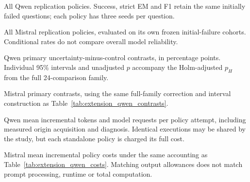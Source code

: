 \documentclass{article}
\begin{document}
\begin{table}[htbp]
\centering\footnotesize
\caption{All Qwen replication policies. Success, strict EM and F1 retain
the same initially failed questions; each policy has three seeds per question.}
\label{tab:extension_qwen_results}

\end{table}

\begin{table}[htbp]
\centering\footnotesize
\caption{All Mistral replication policies, evaluated on its own frozen
initial-failure cohorts. Conditional rates do not compare overall model reliability.}
\label{tab:extension_mistral_results}

\end{table}

\begin{table}[htbp]
\centering\footnotesize
\caption{Qwen primary uncertainty-minus-control contrasts, in percentage
points. Individual 95\% intervals and unadjusted $p$ accompany the
Holm-adjusted $p_H$ from the full 24-comparison family.}
\label{tab:extension_qwen_contrasts}

\end{table}

\begin{table}[htbp]
\centering\footnotesize
\caption{Mistral primary contrasts, using the same full-family correction
and interval construction as Table~\ref{tab:extension_qwen_contrasts}.}
\label{tab:extension_mistral_contrasts}

\end{table}

\begin{table}[htbp]
\centering\footnotesize
\caption{Qwen mean incremental tokens and model requests per policy attempt,
including measured origin acquisition and diagnosis. Identical executions
may be shared by the study, but each standalone policy is charged its full cost.}
\label{tab:extension_qwen_costs}

\end{table}

\begin{table}[htbp]
\centering\footnotesize
\caption{Mistral mean incremental policy costs under the same accounting
as Table~\ref{tab:extension_qwen_costs}. Matching output allowances does not
match prompt processing, runtime or total computation.}
\label{tab:extension_mistral_costs}

\end{table}
\end{document}
